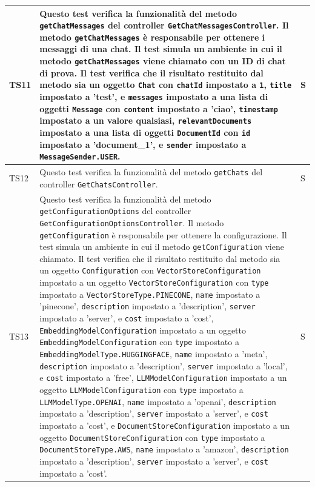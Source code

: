 \documentclass[10pt, a4paper]{article}
\begin{document}
\begin{xltabular}{\textwidth}{p{0.12\textwidth}|X|p{0.12\textwidth}}
    \hline
    TS11 & Questo test verifica la funzionalità del metodo \texttt{getChatMessages} del controller \texttt{GetChatMessagesController}. Il metodo \texttt{getChatMessages} è responsabile per ottenere i messaggi di una chat. Il test simula un ambiente in cui il metodo \texttt{getChatMessages} viene chiamato con un ID di chat di prova. Il test verifica che il risultato restituito dal metodo sia un oggetto \texttt{Chat} con \texttt{chatId} impostato a \texttt{1}, \texttt{title} impostato a 'test', e \texttt{messages} impostato a una lista di oggetti \texttt{Message} con \texttt{content} impostato a 'ciao', \texttt{timestamp} impostato a un valore qualsiasi, \texttt{relevantDocuments} impostato a una lista di oggetti \texttt{DocumentId} con \texttt{id} impostato a 'document\_1', e \texttt{sender} impostato a \texttt{MessageSender.USER}.  & S \\
    \hline
    TS12 & Questo test verifica la funzionalità del metodo \texttt{getChats} del controller \texttt{GetChatsController}.  & S \\
    \hline
    TS13 & Questo test verifica la funzionalità del metodo \texttt{getConfigurationOptions} del controller \texttt{GetConfigurationOptionsController}. Il metodo \texttt{getConfiguration} è responsabile per ottenere la configurazione. Il test simula un ambiente in cui il metodo \texttt{getConfiguration} viene chiamato. Il test verifica che il risultato restituito dal metodo sia un oggetto \texttt{Configuration} con \texttt{VectorStoreConfiguration} impostato a un oggetto \texttt{VectorStoreConfiguration} con \texttt{type} impostato a \texttt{VectorStoreType.PINECONE}, \texttt{name} impostato a 'pinecone', \texttt{description} impostato a 'description', \texttt{server} impostato a 'server', e \texttt{cost} impostato a 'cost', \texttt{EmbeddingModelConfiguration} impostato a un oggetto \texttt{EmbeddingModelConfiguration} con \texttt{type} impostato a \texttt{EmbeddingModelType.HUGGINGFACE}, \texttt{name} impostato a 'meta', \texttt{description} impostato a 'description', \texttt{server} impostato a 'local', e \texttt{cost} impostato a 'free', \texttt{LLMModelConfiguration} impostato a un oggetto \texttt{LLMModelConfiguration} con \texttt{type} impostato a \texttt{LLMModelType.OPENAI}, \texttt{name} impostato a 'openai', \texttt{description} impostato a 'description', \texttt{server} impostato a 'server', e \texttt{cost} impostato a 'cost', e \texttt{DocumentStoreConfiguration} impostato a un oggetto \texttt{DocumentStoreConfiguration} con \texttt{type} impostato a \texttt{DocumentStoreType.AWS}, \texttt{name} impostato a 'amazon', \texttt{description} impostato a 'description', \texttt{server} impostato a 'server', e \texttt{cost} impostato a 'cost'.  & S \\

\end{xltabular}
\end{document}

